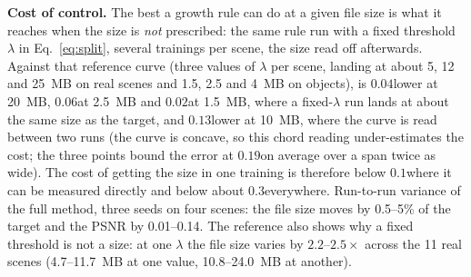 \noindent\textbf{Cost of control.} The best a growth rule can do at a given file size is what it reaches when the size is \emph{not} prescribed: the same rule run with a fixed threshold $\lambda$ in Eq.~\eqref{eq:split}, several trainings per scene, the size read off afterwards. Against that reference curve (three values of $\lambda$ per scene, landing at about 5, 12 and 25~MB on real scenes and 1.5, 2.5 and 4~MB on objects), \BM is $0.04$\dB lower at 20~MB, $0.06$\dB at 2.5~MB and $0.02$\dB at 1.5~MB, where a fixed-$\lambda$ run lands at about the same size as the target, and $0.13$\dB lower at 10~MB, where the curve is read between two runs (the curve is concave, so this chord reading under-estimates the cost; the three points bound the error at $0.19$\dB on average over a span twice as wide). The cost of getting the size in one training is therefore below $0.1$\dB where it can be measured directly and below about $0.3$\dB everywhere. Run-to-run variance of the full method, three seeds on four scenes: the file size moves by 0.5--5\% of the target and the PSNR by 0.01--0.14\dB. The reference also shows why a fixed threshold is not a size: at one $\lambda$ the file size varies by $2.2$--$2.5\times$ across the 11 real scenes (4.7--11.7~MB at one value, 10.8--24.0~MB at another).

